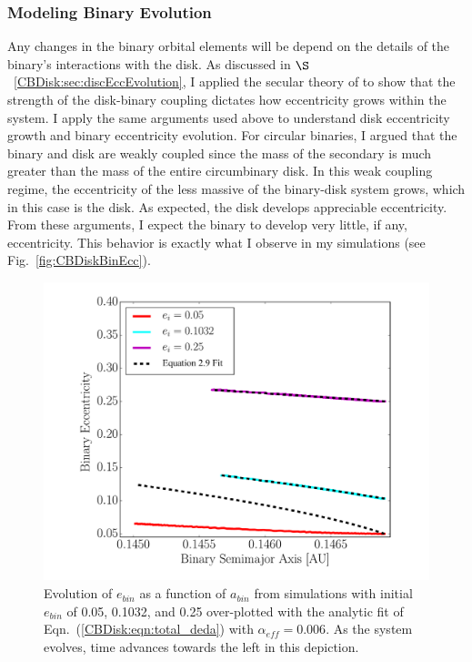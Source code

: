 
\subsubsection{Modeling Binary Evolution} \label{CBDisk:sec:ModelBinaryEvolution}

Any changes in the binary orbital elements will be depend on the
details of the binary's interactions with the disk.  As discussed in
$\S$~\ref{CBDisk:sec:discEccEvolution}, I applied the secular theory of
\citet{Papaloizou2001} to show that the strength of the disk-binary
coupling dictates how eccentricity grows within the system.   I apply the same arguments used above to understand disk eccentricity growth and binary eccentricity evolution.  For circular binaries, I argued that the binary and disk are weakly coupled since the mass of the secondary is much greater than the mass of the entire circumbinary disk.  In this weak coupling regime, the eccentricity of the less massive of the binary-disk system grows, which in this case is the disk.  As expected, the disk develops appreciable eccentricity.  From these arguments, I expect the binary to develop very little, if any, eccentricity.  This behavior is exactly what I observe in my simulations (see Fig.~\ref{fig:CBDiskBinEcc}).

\begin{figure}
	\includegraphics[width=\columnwidth]{f8}
    \caption{Evolution of $e_{bin}$ as a
      function of $a_{bin}$ from simulations with initial $e_{bin}$ of
      0.05, 0.1032, and 0.25 over-plotted with the analytic fit of
      Eqn.~(\ref{CBDisk:eqn:total_deda}) with $\alpha_{eff} = 0.006$.
      As the system evolves, time advances towards the left in this
      depiction.}
    \label{fig:CBDiskFitEqn}
\end{figure}

